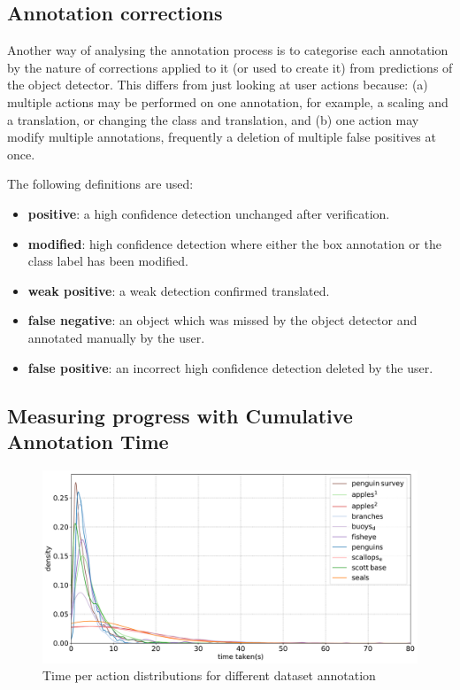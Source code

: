 \subsection{Annotation corrections}
\label{sec:corrections}

Another way of analysing the annotation process is to categorise each annotation by the nature of corrections applied to it (or used to create it) from predictions of the object detector. This differs from just looking at user actions because: (a) multiple actions may be performed on one annotation, for example, a scaling and a translation, or changing the class and translation, and (b) one action may modify multiple annotations, frequently a deletion of multiple false positives at once.

The following definitions are used:

\begin{itemize}
    \item {\bf positive}: a high confidence detection unchanged after verification.
    \item {\bf modified}: high confidence detection where either the box annotation or the class label has been modified.
    \item {\bf weak positive}: a weak detection confirmed translated.    
    \item {\bf false negative}: an object which was missed by the object detector and annotated manually by the user.    
    \item {\bf false positive}: an incorrect high confidence detection deleted by the user.
\end{itemize}

\subsection{Measuring progress with Cumulative Annotation Time}
\label{sec:ann_time}

\begin{figure}
\centering
  \includegraphics[width=1.0\linewidth]{charts/summaries/time_density.pdf}
  \caption{Time per action distributions for different dataset annotation}
  \label{fig:annotation_time_density}
\end{figure}

